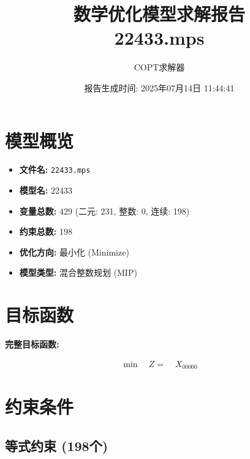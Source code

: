 \documentclass[a4paper,10pt]{article}
\title{数学优化模型求解报告\\{\large 22433.mps}}
\author{COPT求解器}
\date{报告生成时间: 2025年07月14日 11:44:41}
\begin{document}
\maketitle
\tableofcontents
\newpage

\section{模型概览}
\begin{itemize}
    \item \textbf{文件名:} \texttt{22433.mps}
    \item \textbf{模型名:} 22433
    \item \textbf{变量总数:} 429 (二元: 231, 整数: 0, 连续: 198)
    \item \textbf{约束总数:} 198
    \item \textbf{优化方向:} 最小化 (Minimize)
    \item \textbf{模型类型:} 混合整数规划 (MIP)
\end{itemize}
\section{目标函数}

\textbf{完整目标函数:}

\allowdisplaybreaks
{\small
\begin{align}
\min \quad Z = &\; X_{00000}\nonumber
\end{align}
}

\section{约束条件}

\subsection{等式约束 (198个)}
\end{document}
